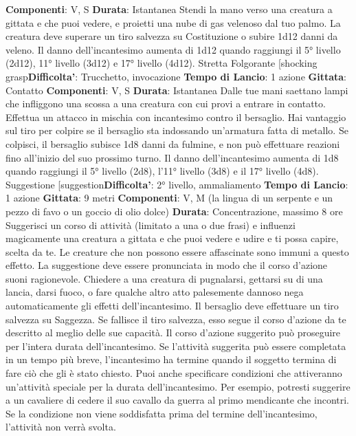 \begin{multicols}{2}
\textbf{Componenti}: V, S
\textbf{Durata}: Istantanea
Stendi la mano verso una creatura a gittata e che puoi
vedere, e proietti una nube di gas velenoso dal tuo
palmo. La creatura deve superare un tiro salvezza su
Costituzione o subire 1d12 danni da veleno.
Il danno dell’incantesimo aumenta di 1d12 quando
raggiungi il 5° livello (2d12), 11° livello (3d12) e 17°
livello (4d12).
Stretta Folgorante
[shocking grasp\textbf{Difficolta'}:
Trucchetto, invocazione
\textbf{Tempo di Lancio}: 1 azione
\textbf{Gittata}: Contatto
\textbf{Componenti}: V, S
\textbf{Durata}: Istantanea
Dalle tue mani saettano lampi che infliggono una
scossa a una creatura con cui provi a entrare in
contatto. Effettua un attacco in mischia con incantesimo
contro il bersaglio. Hai vantaggio sul tiro per colpire se il
bersaglio sta indossando un’armatura fatta di metallo.
Se colpisci, il bersaglio subisce 1d8 danni da fulmine, e
non può effettuare reazioni fino all’inizio del suo
prossimo turno.
Il danno dell’incantesimo aumenta di 1d8 quando
raggiungi il 5° livello (2d8), l’11° livello (3d8) e il 17°
livello (4d8).
Suggestione
[suggestion\textbf{Difficolta'}:
2° livello, ammaliamento
\textbf{Tempo di Lancio}: 1 azione
\textbf{Gittata}: 9 metri
\textbf{Componenti}: V, M (la lingua di un serpente e un pezzo
di favo o un goccio di olio dolce)
\textbf{Durata}: Concentrazione, massimo 8 ore
Suggerisci un corso di attività (limitato a una o due
frasi) e influenzi magicamente una creatura a gittata e
che puoi vedere e udire e ti possa capire, scelta da te.
Le creature che non possono essere affascinate sono
immuni a questo effetto. La suggestione deve essere
pronunciata in modo che il corso d’azione suoni
ragionevole. Chiedere a una creatura di pugnalarsi,
gettarsi su di una lancia, darsi fuoco, o fare qualche
altro atto palesemente dannoso nega automaticamente
gli effetti dell’incantesimo.
Il bersaglio deve effettuare un tiro salvezza su
Saggezza. Se fallisce il tiro salvezza, esso segue il
corso d’azione da te descritto al meglio delle sue
capacità. Il corso d’azione suggerito può proseguire per
l’intera durata dell’incantesimo. Se l’attività suggerita
può essere completata in un tempo più breve,
l’incantesimo ha termine quando il soggetto termina di
fare ciò che gli è stato chiesto.
Puoi anche specificare condizioni che attiveranno
un’attività speciale per la durata dell’incantesimo. Per
esempio, potresti suggerire a un cavaliere di cedere il
suo cavallo da guerra al primo mendicante che incontri.
Se la condizione non viene soddisfatta prima del
termine dell’incantesimo, l’attività non verrà svolta.

\end{multicols}
